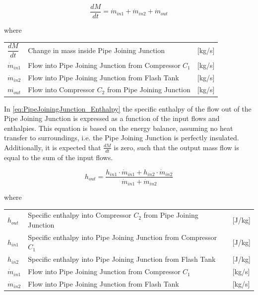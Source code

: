 \begin{equation} \label{eq:PipeJoiningJunction_ChangeOfMass}
	\frac{dM}{dt} = \dot{m}_{in1} + \dot{m}_{in2} + \dot{m}_{out}
\end{equation}


where

\begin{center}
	\begin{tabular}{l p{8cm} l}
		$\dfrac{dM}{dt}$ & Change in mass inside Pipe Joining Junction		 	& [\si{kg}/\si{s}]\\
		$\dot{m}_{in1}$ & Flow into Pipe Joining Junction from Compressor $ C_1 $ 		& [\si{kg}/\si{s}]\\
		$\dot{m}_{in2}$ & Flow into Pipe Joining Junction from Flash Tank 				& [\si{kg}/\si{s}]\\
		$\dot{m_{out}}$ & Flow into Compressor $ C_2 $ from Pipe Joining Junction		& [\si{kg}/\si{s}]\\
	\end{tabular}
\end{center}

In \cref{eq:PipeJoiningJunction_Enthalpy} the specific enthalpy of the flow out of the Pipe Joining Junction is expressed as a function of the input flows and enthalpies. This equation is based on the energy balance, assuming no heat transfer to surroundings, i.e. the Pipe Joining Junction is perfectly insulated. Additionally, it is expected that $\frac{dM}{dt}$ is zero, such that the output mass flow is equal to the sum of the input flows. 

\begin{equation} \label{eq:PipeJoiningJunction_Enthalpy}
	h_{out} = \frac{h_{in1} \cdot \dot{m}_{in1} + h_{in2} \cdot \dot{m}_{in2}}{ \dot{m}_{in1} + \dot{m}_{in2} }
\end{equation}

where

\begin{center}
	\begin{tabular}{l p{10cm} l}
		$h_{out}$ 			& Specific enthalpy into Compressor $ C_2 $ from Pipe Joining Junction 			& [\si{J}/\si{kg}]\\
		$h_{in1}$ 			& Specific enthalpy into Pipe Joining Junction from Compressor $ C_1 $  					& [\si{J}/\si{kg}]\\
		$h_{in2}$ 			& Specific enthalpy into Pipe Joining Junction from Flash Tank   				& [\si{J}/\si{kg}]\\
		$\dot{m}_{in1}$ 	& Flow into Pipe Joining Junction from Compressor $ C_1 $ 		& [\si{kg}/\si{s}]\\
		$\dot{m}_{in2}$ 	& Flow into Pipe Joining Junction from Flash Tank 				& [\si{kg}/\si{s}]\\
	\end{tabular}
\end{center}


